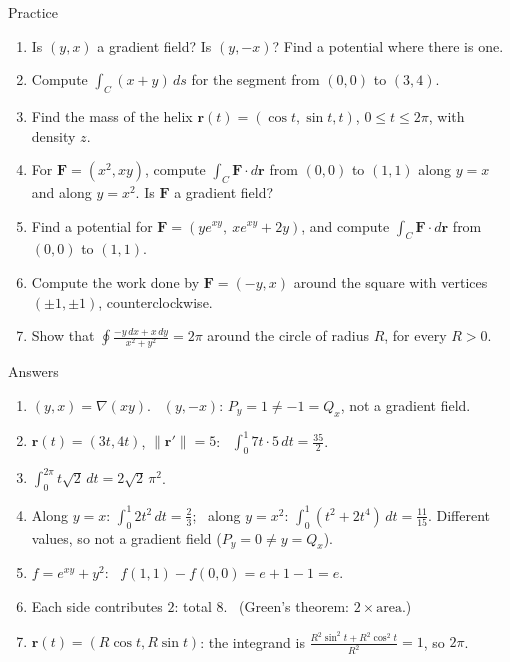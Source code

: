\documentclass[10pt]{wosm-slides}
\newcommand{\norm}[1]{\lVert #1 \rVert}
\newcommand{\vr}{\mathbf{r}}
\newcommand{\vF}{\mathbf{F}}
\begin{document}
\begin{frame}{Practice}
  \small
  \begin{enumerate}
    \item Is $(y, x)$ a gradient field? Is $(y, -x)$? Find a potential where there is one.
    \item Compute $\int_C (x + y)\, ds$ for the segment from $(0, 0)$ to $(3, 4)$.
    \item Find the mass of the helix $\vr(t) = (\cos t, \sin t, t)$, $0 \le t \le 2\pi$, with density $z$.
    \item For $\vF = (x^2, xy)$, compute $\int_C \vF \cdot d\vr$ from $(0, 0)$ to $(1, 1)$ along $y = x$ and
      along $y = x^2$. Is $\vF$ a gradient field?
    \item Find a potential for $\vF = (y e^{xy}, \ x e^{xy} + 2y)$, and compute $\int_C \vF \cdot d\vr$ from
      $(0, 0)$ to $(1, 1)$.
    \item Compute the work done by $\vF = (-y, x)$ around the square with vertices $(\pm 1, \pm 1)$,
      counterclockwise.
    \item Show that $\oint \frac{-y\, dx + x\, dy}{x^2 + y^2} = 2\pi$ around the circle of radius $R$, for
      every $R > 0$.
  \end{enumerate}
\end{frame}

\begin{frame}{Answers}
  \small
  \begin{enumerate}
    \item $(y, x) = \nabla(xy)$. \ $(y, -x)$: $P_y = 1 \ne -1 = Q_x$, not a gradient field.
    \item $\vr(t) = (3t, 4t)$, $\norm{\vr'} = 5$: \ $\int_0^1 7t \cdot 5\, dt = \frac{35}{2}$.
    \item $\int_0^{2\pi} t\sqrt2\, dt = 2\sqrt2\, \pi^2$.
    \item Along $y = x$: $\int_0^1 2t^2\, dt = \frac23$; \ along $y = x^2$: $\int_0^1 (t^2 + 2t^4)\, dt = \frac{11}{15}$.
      Different values, so not a gradient field ($P_y = 0 \ne y = Q_x$).
    \item $f = e^{xy} + y^2$: \ $f(1, 1) - f(0, 0) = e + 1 - 1 = e$.
    \item Each side contributes $2$: total $8$. \ (Green's theorem: $2 \times \text{area}$.)
    \item $\vr(t) = (R\cos t, R\sin t)$: the integrand is $\frac{R^2\sin^2 t + R^2 \cos^2 t}{R^2} = 1$, so $2\pi$.
  \end{enumerate}
\end{frame}
\end{document}
